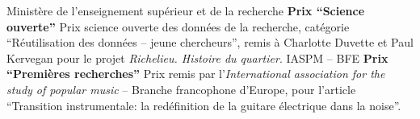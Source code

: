 	{%
		Ministère de l'enseignement supérieur et de la recherche}
	{%
		\textbf{Prix \enquote{Science ouverte} }}
	{%
		Prix science ouverte des données de la recherche, catégorie \enquote{Réutilisation des données -- jeune chercheurs}, remis à Charlotte Duvette et Paul Kervegan pour le projet \textit{Richelieu. Histoire du quartier}.}
	{%
		IASPM -- BFE}
	{%
		\textbf{Prix \enquote{Premières recherches} }}
	{%
		Prix remis par l'\textit{International association for the study of popular music} -- Branche francophone d'Europe, pour l'article \enquote{Transition instrumentale: la redéfinition de la guitare électrique dans la noise}.}

